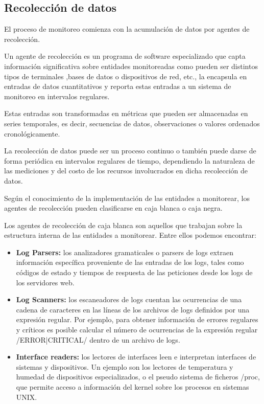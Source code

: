 \subsection{Recolección de datos}
\label{recoleccion_de_datos}
El proceso de monitoreo comienza con la acumulación de datos por agentes de
recolección.

Un agente de recolección es un programa de software especializado que capta
información significativa sobre entidades monitoreadas como pueden ser
distintos tipos de terminales ,bases de datos o dispositivos de red, etc., la
encapsula en entradas de datos cuantitativos y reporta estas entradas a un
sistema de monitoreo en intervalos regulares.

Estas entradas son transformadas en métricas que pueden ser almacenadas en
series temporales, es decir, secuencias de datos, observaciones o valores
ordenados cronológicamente.

La recolección de datos puede ser un proceso continuo o también puede darse de
forma periódica en intervalos regulares de tiempo, dependiendo la naturaleza de
las mediciones y del costo de los recursos involucrados en dicha recolección de
datos.

Según el conocimiento de la implementación de las entidades a monitorear, los
agentes de recolección pueden clasificarse en caja blanca o caja negra.

Los agentes de recolección de caja blanca son aquellos que trabajan sobre la
estructura interna de las entidades a monitorear. Entre ellos podemos
encontrar:

\begin{itemize}
  \item \textbf{Log Parsers:} los analizadores gramaticales o parsers de logs
    extraen información específica proveniente de las entradas de los logs,
    tales como códigos de estado y tiempos de respuesta de las peticiones desde
    los logs de los servidores web.

  \item \textbf{Log Scanners:} los escaneadores de logs cuentan las ocurrencias
    de una cadena de caracteres en las líneas de los archivos de logs definidos
    por una expresión regular. Por ejemplo, para obtener información de errores
    regulares y críticos es posible calcular el número de ocurrencias de la
    expresión regular /ERROR|CRITICAL/ dentro de un archivo de logs.

  \item \textbf{Interface readers:} los lectores de interfaces leen e
    interpretan interfaces de sistemas y dispositivos. Un ejemplo son los
    lectores de temperatura y humedad de dispositivos especializados, o el
    pseudo sistema de ficheros /proc, que permite acceso a información del
    kernel sobre los procesos en sistemas UNIX.
\end{itemize}

